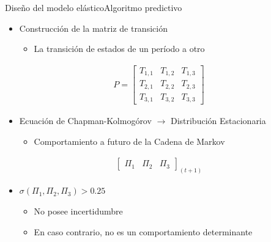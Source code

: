 \begin{frame}{Diseño del modelo elástico}{Algoritmo predictivo}
\begin{itemize}
	\item Construcción de la matriz de transición
		\begin{itemize}
			\item La transición de estados de un período a otro
		\end{itemize}
\end{itemize}
\vspace{-1cm}
\begin{center}
\begin{align*}
	P =
	\begin{bmatrix}
		T_{1,1} & T_{1,2} & T_{1,3} \\
		T_{2,1} & T_{2,2} & T_{2,3} \\
		T_{3,1} & T_{3,2} & T_{3,3}
	\end{bmatrix}	
\end{align*}
\end{center}

\begin{itemize}		
	\item Ecuación de Chapman-Kolmogórov $\rightarrow$ Distribución Estacionaria
	\begin{itemize}
		\item Comportamiento a futuro de la Cadena de Markov
	\end{itemize}
\end{itemize}
\vspace{-1cm}
\begin{center}
\begin{align*}
\begin{bmatrix}
	\Pi_1 & \Pi_2 & \Pi_3
\end{bmatrix} _{(t+1)}
\end{align*}
\end{center}
\vspace{-0.5cm}
\begin{itemize}		
	\item $\sigma(\Pi_1, \Pi_2, \Pi_3) > 0.25$
	\begin{itemize}
		\item No posee incertidumbre
		\item En caso contrario, no es un comportamiento determinante
	\end{itemize}
\end{itemize}
\end{frame}

